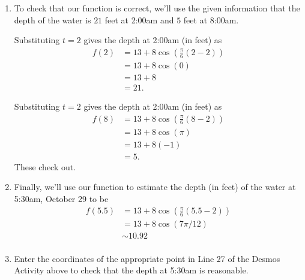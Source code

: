 \documentclass{ximera}
\begin{document}
\begin{example}
\begin{explanation}
\begin{enumerate}
\item To check that our function is correct, we'll use the given information that the depth of the water is $21$ feet at 2:00am and $5$ feet at 8:00am.

Substituting $t=2$ gives the depth at 2:00am (in feet) as
\begin{align*}
   f(2)   & = 13 + 8 \cos \left(  \frac{\pi}{6} \left( 2 - 2 \right) \right) \\ 
           & = 13 + 8 \cos (0)  \\ 
           & = 13 + 8 \\
           & = 21 .
\end{align*}

Substituting $t=2$ gives the depth at 2:00am (in feet) as
\begin{align*}
   f(8)   & = 13 + 8 \cos \left(  \frac{\pi}{6} \left(8 - 2 \right) \right) \\ 
           & = 13 + 8 \cos (\pi)  \\ 
           & = 13 + 8(-1) \\
           & = 5 .
\end{align*}
These check out.

\item Finally, we'll use our function to estimate the depth (in feet) of the water at 5:30am, October 29 to be
\begin{align*}
   f(5.5)   & = 13 + 8 \cos \left(  \frac{\pi}{6} \left(5.5 - 2 \right) \right) \\ 
           & = 13 + 8 \cos (7\pi / 12)  \\ 
           &  \sim  10.92 \\
         \end{align*}

\item Enter the coordinates of the appropriate point in Line 27 of the Desmos Activity above to check that the depth at 5:30am is reasonable.

\end{enumerate}

\end{explanation}

\end{example}
\end{document}
